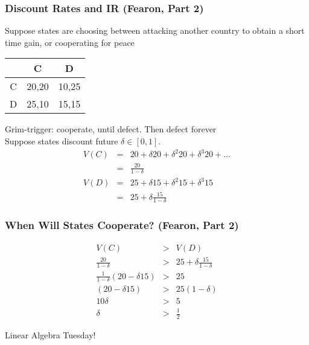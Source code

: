 \documentclass{beamer}
\numberwithin{equation}{section}
\begin{document}
\begin{frame}
\frametitle{Discount Rates and IR (Fearon, Part 2) }

Suppose states are choosing between \alert{attacking} another country to obtain a short time gain, or \alert{cooperating} for peace

\begin{tabular}{c|c|c}
		& C   & D  \\
		\hline
C 		& 20,20	& 10,25    \\
\hline
D 		&25,10	& 15,15	\\
\hline
\end{tabular}		

\alert{Grim-trigger}: cooperate, until defect.  Then defect forever \\
Suppose states \alert{discount} future $\delta \in[0,1]$.  \\
\begin{eqnarray}
V(C) & = & 20 + \delta 20 + \delta^2 20 + \delta^3 20  + \hdots \nonumber \\
		& = & \frac{20}{1- \delta} \nonumber \\
V(D) & = & 25 + \delta 15 + \delta^2 15 + \delta^3 15 \nonumber \\
		& = & 25 + \delta \frac{15}{1- \delta} \nonumber 
\end{eqnarray}				





\end{frame}

\begin{frame}
\frametitle{When Will States Cooperate? (Fearon, Part 2)}


\begin{eqnarray}
V(C) & >& V(D) \nonumber \\
\frac{20}{1- \delta} & > & 25 + \delta \frac{15}{1- \delta} \nonumber \\
\frac{1}{1- \delta} (20 - \delta 15) & > & 25 \nonumber \\
(20 - \delta 15) & > & 25 (1 - \delta ) \nonumber \\
10\delta  & > & 5 \nonumber \\
\delta & > & \frac{1}{2} \nonumber
\end{eqnarray}


\end{frame}




\begin{frame}

Linear Algebra Tuesday!



\end{frame}
\end{document}
